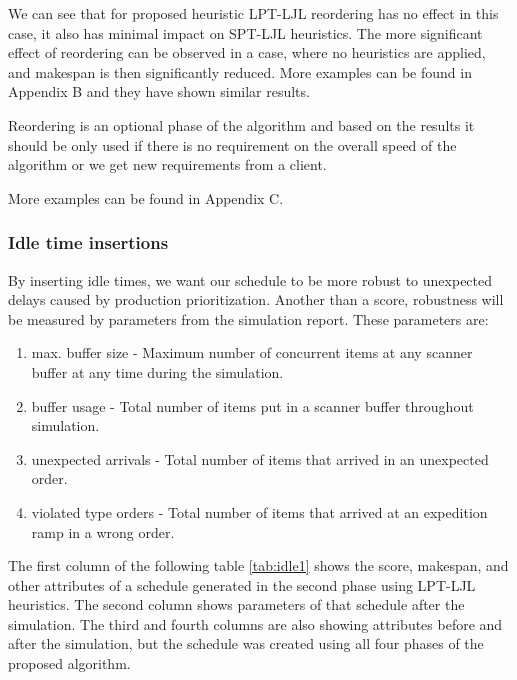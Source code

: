 \documentclass{ctuthesis}
\begin{document}
We can see that for proposed heuristic LPT-LJL reordering has no effect in this case, it also has minimal impact on SPT-LJL heuristics. The more significant effect of reordering can be observed in a case, where no heuristics are applied, and makespan is then significantly reduced. More examples can be found in Appendix B and they have shown similar results.

Reordering is an optional phase of the algorithm and based on the results it should be only used if there is no requirement on the overall speed of the algorithm or we get new requirements from a client. 

More examples can be found in Appendix C.

\subsubsection{Idle time insertions}
\label{subsubsec:idletimeinsertions}

By inserting idle times, we want our schedule to be more robust to unexpected delays caused by production prioritization. Another than a score, robustness will be measured by parameters from the simulation report. These parameters are:

\begin{enumerate}
    \item max. buffer size - Maximum number of concurrent items at any scanner buffer at any time during the simulation.
    \item buffer usage - Total number of items put in a scanner buffer throughout simulation.
    \item unexpected arrivals - Total number of items that arrived in an unexpected order.
    \item violated type orders - Total number of items that arrived at an expedition ramp in a wrong order.
\end{enumerate}

The first column of the following table  \ref{tab:idle1} shows the score, makespan, and other attributes of a schedule generated in the second phase using LPT-LJL heuristics. The second column shows parameters of that schedule after the simulation. The third and fourth columns are also showing attributes before and after the simulation, but the schedule was created using all four phases of the proposed algorithm.
\end{document}

